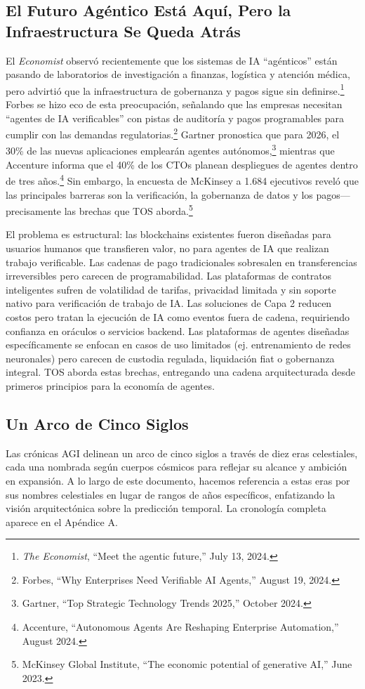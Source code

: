 \documentclass[11pt]{article}
\begin{document}
\subsection{El Futuro Agéntico Está Aquí, Pero la Infraestructura Se Queda Atrás}
El \emph{Economist} observó recientemente que los sistemas de IA ``agénticos'' están pasando de laboratorios de investigación a finanzas, logística y atención médica, pero advirtió que la infraestructura de gobernanza y pagos sigue sin definirse.\footnote{\emph{The Economist}, ``Meet the agentic future,'' July 13, 2024.} Forbes se hizo eco de esta preocupación, señalando que las empresas necesitan ``agentes de IA verificables'' con pistas de auditoría y pagos programables para cumplir con las demandas regulatorias.\footnote{Forbes, ``Why Enterprises Need Verifiable AI Agents,'' August 19, 2024.} Gartner pronostica que para 2026, el 30\% de las nuevas aplicaciones emplearán agentes autónomos,\footnote{Gartner, ``Top Strategic Technology Trends 2025,'' October 2024.} mientras que Accenture informa que el 40\% de los CTOs planean despliegues de agentes dentro de tres años.\footnote{Accenture, ``Autonomous Agents Are Reshaping Enterprise Automation,'' August 2024.} Sin embargo, la encuesta de McKinsey a 1.684 ejecutivos reveló que las principales barreras son la verificación, la gobernanza de datos y los pagos---precisamente las brechas que TOS aborda.\footnote{McKinsey Global Institute, ``The economic potential of generative AI,'' June 2023.}

El problema es estructural: las blockchains existentes fueron diseñadas para usuarios humanos que transfieren valor, no para agentes de IA que realizan trabajo verificable. Las cadenas de pago tradicionales sobresalen en transferencias irreversibles pero carecen de programabilidad. Las plataformas de contratos inteligentes sufren de volatilidad de tarifas, privacidad limitada y sin soporte nativo para verificación de trabajo de IA. Las soluciones de Capa 2 reducen costos pero tratan la ejecución de IA como eventos fuera de cadena, requiriendo confianza en oráculos o servicios backend. Las plataformas de agentes diseñadas específicamente se enfocan en casos de uso limitados (ej. entrenamiento de redes neuronales) pero carecen de custodia regulada, liquidación fiat o gobernanza integral. TOS aborda estas brechas, entregando una cadena arquitecturada desde primeros principios para la economía de agentes.

\subsection{Un Arco de Cinco Siglos}
Las crónicas AGI delinean un arco de cinco siglos a través de diez eras celestiales, cada una nombrada según cuerpos cósmicos para reflejar su alcance y ambición en expansión. A lo largo de este documento, hacemos referencia a estas eras por sus nombres celestiales en lugar de rangos de años específicos, enfatizando la visión arquitectónica sobre la predicción temporal. La cronología completa aparece en el Apéndice A.
\end{document}
